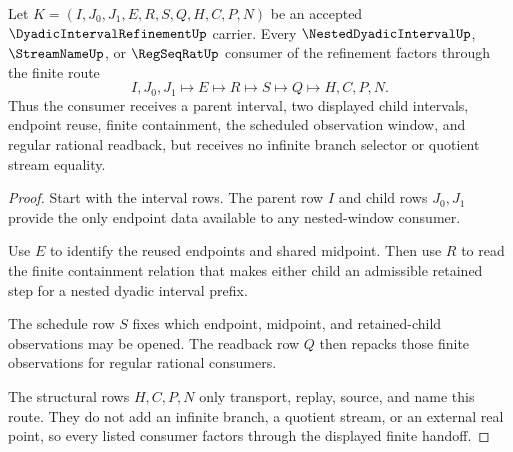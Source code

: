\begin{theorem}
\label{thm:dyadic-interval-refinement-window-handoff}
Let $K=(I,J_0,J_1,E,R,S,Q,H,C,P,N)$ be an accepted $\DyadicIntervalRefinementUp$ carrier. Every $\NestedDyadicIntervalUp$, $\StreamNameUp$, or $\RegSeqRatUp$ consumer of the refinement factors through the finite route
$$
I,J_0,J_1 \longmapsto E \longmapsto R \longmapsto S \longmapsto Q \longmapsto H,C,P,N .
$$
Thus the consumer receives a parent interval, two displayed child intervals, endpoint reuse, finite containment, the scheduled observation window, and regular rational readback, but receives no infinite branch selector or quotient stream equality.
\end{theorem}
\begin{proof}
Start with the interval rows. The parent row $I$ and child rows $J_0,J_1$ provide the only endpoint data available to any nested-window consumer.

Use $E$ to identify the reused endpoints and shared midpoint. Then use $R$ to read the finite containment relation that makes either child an admissible retained step for a nested dyadic interval prefix.

The schedule row $S$ fixes which endpoint, midpoint, and retained-child observations may be opened. The readback row $Q$ then repacks those finite observations for regular rational consumers.

The structural rows $H,C,P,N$ only transport, replay, source, and name this route. They do not add an infinite branch, a quotient stream, or an external real point, so every listed consumer factors through the displayed finite handoff.
\end{proof}

